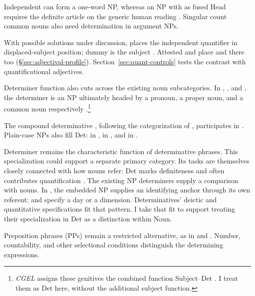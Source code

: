 \documentclass[12pt]{article}
\begin{document}
Independent  can form a one-word NP, whereas an NP with  as fused Head requires the definite article  on the generic human reading \citep[417--418]{huddleston2002}. Singular count common nouns also need determination in argument NPs.

With possible solutions under discussion,  places the independent quantifier in displaced-subject position; dummy  is the subject \citep[1391--1393]{huddleston2002}. Attested  and  place  and  there too (§\ref{sec:adjectival-profile}). Section~\ref{sec:quant-controls} tests the contrast with quantificational adjectives.

Determiner function also cuts across the existing noun subcategories. In , , and , the determiner is an NP ultimately headed by a pronoun, a proper noun, and a common noun respectively \citep[354--355, 470--471]{huddleston2002}.\footnote{\textit{CGEL} assigns these genitives the combined function Subject--Det \citep[472--473]{huddleston2002}. I treat them as Det here, without the additional subject function.}

The compound determinative , following the categorization of \textcite[§1.3]{Payne2007}, participates in . Plain-case NPs also fill Det:  in ,  in , and  in  \citep[355, 357]{huddleston2002}.

Determiner remains the characteristic function of determinative phrases. This specialization could support a separate primary category. Its tasks are themselves closely connected with how nouns refer: Det marks definiteness and often contributes quantification \citep[354--359]{huddleston2002}. The existing NP determiners supply a comparison with nouns. In , the embedded NP supplies an identifying anchor through its own referent;  and  specify a day or a dimension. Determinatives' deictic and quantitative specifications fit that pattern. I take that fit to support treating their specialization in Det as a distinction within Noun.

Preposition phrases (PPs) remain a restricted alternative, as in  and  \citep[357, 433]{huddleston2002}. Number, countability, and other selectional conditions distinguish the determining expressions.
\end{document}
